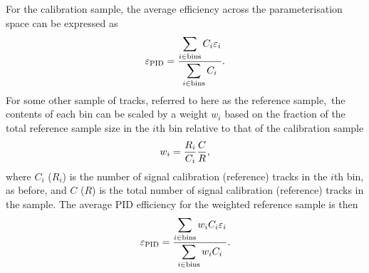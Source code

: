 For the calibration sample, the average efficiency across the parameterisation
space can be expressed as
\begin{equation}
  \effpid = \frac{%
    \displaystyle\sum_{i \in \textnormal{bins}} C_{i}\eff_{i}
    }{%
    \displaystyle\sum_{i \in \textnormal{bins}} C_{i}
    }.
\end{equation}
For some other sample of tracks, referred to here as the reference
sample,\footnotemark\ the contents of each bin can be scaled by a weight
$w_{i}$ based on the fraction of the total reference sample size in the $i$th
bin relative to that of the calibration sample
\begin{equation}
  w_{i} = \frac{%
    R_{i}
  }{%
    C_{i}
  }\frac{%
    C
  }{%
    R
  },
  \label{eqn:prod:effs:pid:ref_weight}
\end{equation}
where $C_{i}$ ($R_{i}$) is the number of signal calibration (reference) tracks
in the $i$th bin, as before, and $C$ ($R$) is the total number of signal
calibration (reference) tracks in the sample.
The average \ac{PID} efficiency for the weighted reference sample is then
\begin{equation}
  \effpid = \frac{%
    \displaystyle\sum_{i \in \textnormal{bins}} w_{i}C_{i}\eff_{i}
  }{%
    \displaystyle\sum_{i \in \textnormal{bins}} w_{i}C_{i}
  }.
  \label{eqn:prod:effs:pid:single_track_ref_eff}
\end{equation}


